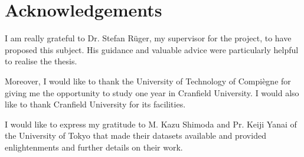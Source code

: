 \chapter{Acknowledgements}

I am really grateful to Dr. Stefan Rüger, my supervisor for the project, to have proposed this subject. His guidance and valuable advice were particularly helpful to realise the thesis.

Moreover, I would like to thank the University of Technology of Compiègne for giving me the opportunity to study one year in Cranfield University. I would also like to thank Cranfield University for its facilities.

I would like to express my gratitude to M. Kazu Shimoda and Pr. Keiji Yanai of the University of Tokyo that made their datasets available and provided enlightenments and further details on their work.